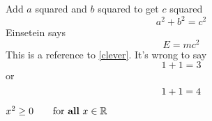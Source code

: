 \documentclass{article}
\begin{document}
	Add $a$ squared and $b$ squared
	to get $c$ squared
	\begin{equation}
	a^2 +b^2 = c^2	
	\end{equation}
	Einsetein says
	\begin{equation}
	E = mc^2 \label{clever}
	\end{equation}
	This is a reference to
	\eqref{clever}.
	It's wrong to say
	\begin{equation}
	1 + 1 = 3 \tag{dumb}
	\end{equation}
	or
	\begin{equation}
	1 + 1 = 4 \notag
	\end{equation}
	
	$x^{2} \geq 0 \qquad
	\text{for \textbf{all} }
	x\in\mathbb{R}$
	
	
	
\end{document}
